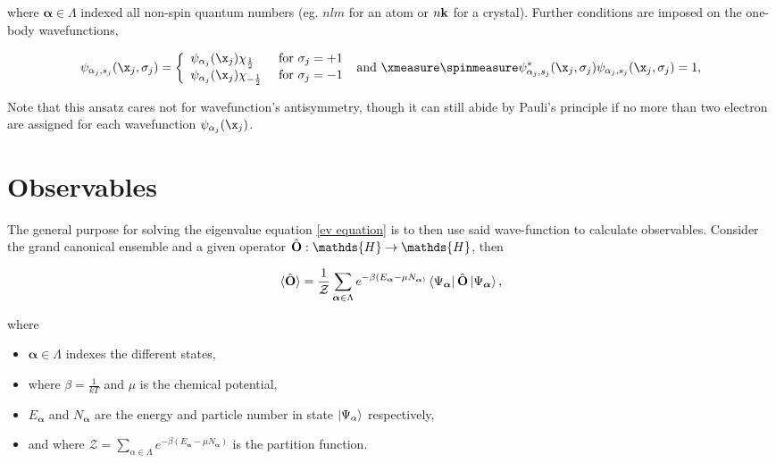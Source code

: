 \documentclass{homework}
\begin{document}
where $\bm{\alpha} \in \Lambda$ indexed all non-spin quantum numbers (eg. $nlm$ for an atom or $n{\bf k}$ for a crystal). Further conditions are imposed on the one-body wavefunctions,

\begin{align*}
     \psi_{\alpha_j, s_j}(\x_j, \sigma_j) =  \left\{ \begin{array}{lcc}
         \psi_{\alpha_j}(\x_j) \chi_{\frac{1}{2}} & \textnormal{ for } \sigma_j = +1 \\
         \psi_{\alpha_j}(\x_j) \chi_{-\frac{1}{2}} & \textnormal{ for } \sigma_j = -1   
     \end{array} \right. \textnormal{ and }
     \xmeasure \spinmeasure \psi_{\alpha_j, s_j}^{*}(\x_j, \sigma_j) \psi_{\alpha_j, s_j}(\x_j, \sigma_j) = 1,
\end{align*}

 Note that this ansatz cares not for wavefunction's antisymmetry, though it can still abide by Pauli's principle if no more than two electron are assigned for each wavefunction $\psi_{\alpha_j}(\x_j)$.

\section{Observables}

The general purpose for solving the eigenvalue equation \eqref{ev equation} is to then use said wave-function to calculate observables. Consider the grand canonical ensemble and a given operator $\hat{\bf O} : \mathds{H} \rightarrow \mathds{H}$, then 

\begin{equation}
\langle \hat{\bf O} \rangle = \frac{1}{\mathcal{Z}} \sum_{\bm{\alpha }\in \Lambda} e^{-\beta(E_{\bm{\alpha} }- \mu N_{\bm{\alpha})}} \bra{\Psi_{\bm{\alpha}}}\hat{\bf O}\ket{\Psi_{\bm{\alpha}}},
\label{grand canonical}
\end{equation}

where 

\begin{itemize}
    \item $\bm \alpha \in {\Lambda}$ indexes the different states, 
    \item where $\beta = \frac{1}{kT}$ and $\mu$ is the chemical potential,
    \item $E_{\bm{\alpha}}$ and $N_{\bm{\alpha}}$ are the energy and particle number in state $\ket{\Psi_\alpha}$ respectively,
    \item and where $\mathcal{Z} =  \sum_{\alpha \in \Lambda} e^{-\beta(E_{\bm \alpha} - \mu N_{\bm \alpha})}$ is the partition function. 
\end{itemize}
\end{document}
